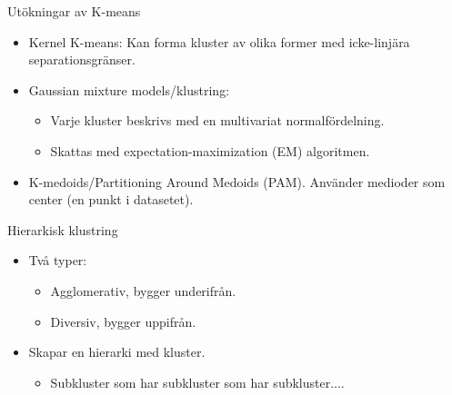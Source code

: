 \documentclass[10pt,english]{beamer}
\begin{document}
\begin{frame}{Utökningar av K-means}

    \begin{itemize}
        \item Kernel K-means: Kan forma kluster av olika former med icke-linjära separationsgränser.
        \item Gaussian mixture models/klustring:
        \begin{itemize}
            \item Varje kluster beskrivs med en multivariat normalfördelning.
            \item Skattas med expectation-maximization (EM) algoritmen.
        \end{itemize}
        \item K-medoids/Partitioning Around Medoids (PAM). Använder medioder som center (en punkt i datasetet).
    \end{itemize}
    
\end{frame}

\begin{frame}{Hierarkisk klustring}

\begin{itemize}
    \item Två typer:
    \begin{itemize}
        \item Agglomerativ, bygger underifrån.
        \item Diversiv, bygger uppifrån.
    \end{itemize}
    \item Skapar en hierarki med kluster.
    \begin{itemize}
        \item Subkluster som har subkluster som har subkluster....
    \end{itemize}
\end{itemize}    
    
\end{frame}
\end{document}
